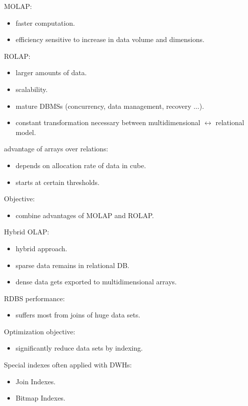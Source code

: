 \begin{breakbox}
\newline MOLAP:
\begin{itemize}
	\item faster computation.
	\item efficiency sensitive to increase in data volume and dimensions.
\end{itemize}
ROLAP:
\begin{itemize}
	\item larger amounts of data.
	\item scalability.
	\item mature DBMSs (concurrency, data management, recovery $\ldots$).
	\item constant transformation necessary between multidimensional $\leftrightarrow$ relational model.
\end{itemize}
\end{breakbox}

\begin{breakbox}
\newline advantage of arrays over relations:
\begin{itemize}
	\item depends on allocation rate of data in cube.
	\item starts at certain thresholds.
\end{itemize}
Objective:
\begin{itemize}
	\item combine advantages of MOLAP and ROLAP.
\end{itemize}
Hybrid OLAP:
\begin{itemize}
	\item hybrid approach.
	\item sparse data remains in relational DB.
	\item dense data gets exported to multidimensional arrays.
\end{itemize}
\end{breakbox}

\begin{breakbox}
\newline RDBS performance:
\begin{itemize}
	\item suffers most from joins of huge data sets.
\end{itemize}
 Optimization objective:
\begin{itemize}
	\item significantly reduce data sets by indexing.
\end{itemize}
Special indexes often applied with DWHs:
\begin{itemize}
	\item Join Indexes.
	\item Bitmap Indexes.
\end{itemize}
\end{breakbox}

